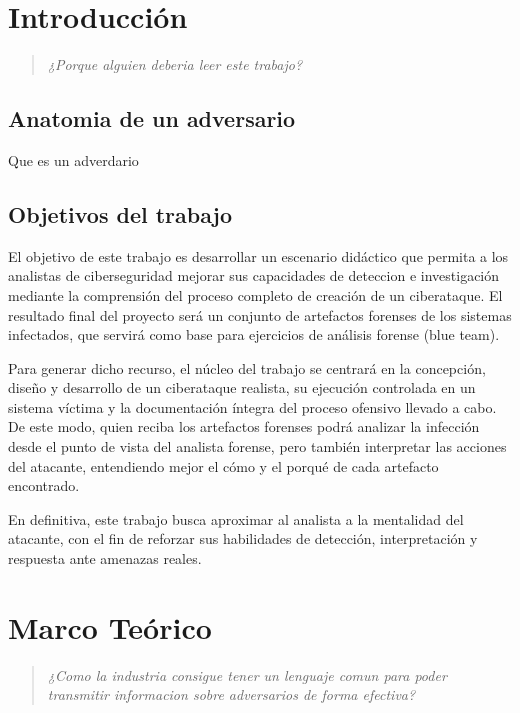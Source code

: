 \chapter{Introducción}

\begin{quote}
\textit{¿Porque alguien deberia leer este trabajo?}
\end{quote}

\section{Anatomia de un adversario}

Que es un adverdario

\section{Objetivos del trabajo}

El objetivo de este trabajo es desarrollar un escenario didáctico que permita a
los analistas de ciberseguridad mejorar sus capacidades de deteccion e investigación
mediante la comprensión del proceso completo de creación de un ciberataque. El
resultado final del proyecto será un conjunto de artefactos forenses de los
sistemas infectados, que servirá como base para ejercicios de análisis forense
(blue team).

Para generar dicho recurso, el núcleo del trabajo se centrará en la concepción,
diseño y desarrollo de un ciberataque realista, su ejecución controlada en un
sistema víctima y la documentación íntegra del proceso ofensivo llevado a cabo. 
De este modo, quien reciba los artefactos forenses podrá analizar la infección 
desde el punto de vista del analista forense, pero también interpretar las acciones del atacante, entendiendo mejor
el cómo y el porqué de cada artefacto encontrado.

En definitiva, este trabajo busca aproximar al analista a la mentalidad del
atacante, con el fin de reforzar sus habilidades de detección, interpretación y
respuesta ante amenazas reales.



\chapter{Marco Teórico}

\begin{quote}
\textit{¿Como la industria consigue tener un lenguaje comun para poder transmitir
informacion sobre adversarios de forma efectiva?}
\end{quote}

